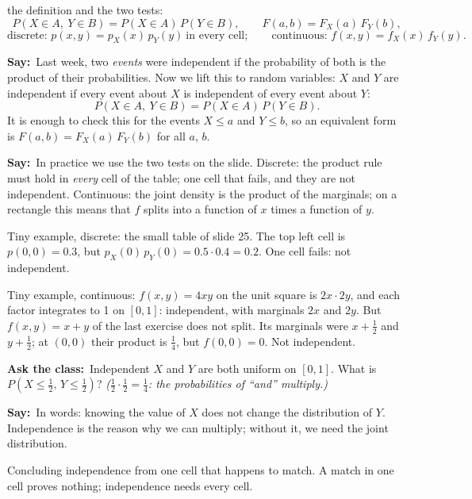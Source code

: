 \documentclass[11pt,a4paper,parskip=half]{scrartcl}
\newcommand{\say}{\textbf{\color{teal}Say:}\ }
\newcommand{\ask}{\textbf{\color{navy}Ask the class:}\ }
\begin{document}
\begin{printeq}
\begin{slidefig}
	the definition and the two tests:
	\[ P(X\in A,\ Y\in B)=P(X\in A)\,P(Y\in B),\qquad
		F(a,b)=F_X(a)\,F_Y(b), \]
	\[ \text{discrete: } p(x,y)=p_X(x)\,p_Y(y)\ \text{in every cell};\qquad
		\text{continuous: } f(x,y)=f_X(x)\,f_Y(y). \]
\end{slidefig}
\end{printeq}

\say Last week, two \emph{events} were independent if the probability of
both is the product of their probabilities. Now we lift this to random
variables: $X$ and $Y$ are independent if every event about $X$ is
independent of every event about $Y$:
\[ P(X\in A,\ Y\in B)=P(X\in A)\,P(Y\in B). \]
It is enough to check this for the events $X\le a$ and $Y\le b$, so an
equivalent form is $F(a,b)=F_X(a)\,F_Y(b)$ for all $a$, $b$.

\say In practice we use the two tests on the slide. Discrete: the product
rule must hold in \emph{every} cell of the table; one cell that fails, and
they are not independent. Continuous: the joint density is the product of
the marginals; on a rectangle this means that $f$ splits into a function
of $x$ times a function of $y$.

Tiny example, discrete: the small table of slide 25. The top left cell is
$p(0,0)=0.3$, but $p_X(0)\,p_Y(0)=0.5\cdot0.4=0.2$. One cell fails: not
independent.

Tiny example, continuous: $f(x,y)=4xy$ on the unit square is
$2x\cdot2y$, and each factor integrates to 1 on $[0,1]$: independent, with
marginals $2x$ and $2y$. But $f(x,y)=x+y$ of the last exercise does not
split. Its marginals were $x+\tfrac12$ and $y+\tfrac12$; at $(0,0)$ their
product is $\tfrac14$, but $f(0,0)=0$. Not independent.

\ask Independent $X$ and $Y$ are both uniform on $[0,1]$. What is
$P(X\le\tfrac12,\,Y\le\tfrac12)$? \emph{($\tfrac12\cdot\tfrac12=\tfrac14$:
the probabilities of ``and'' multiply.)}

\say In words: knowing the value of $X$ does not change the distribution
of $Y$. Independence is the reason why we can multiply; without it, we
need the joint distribution.

\begin{mistake}
	Concluding independence from one cell that happens to match. A match in
	one cell proves nothing; independence needs every cell.
\end{mistake}
\end{document}
